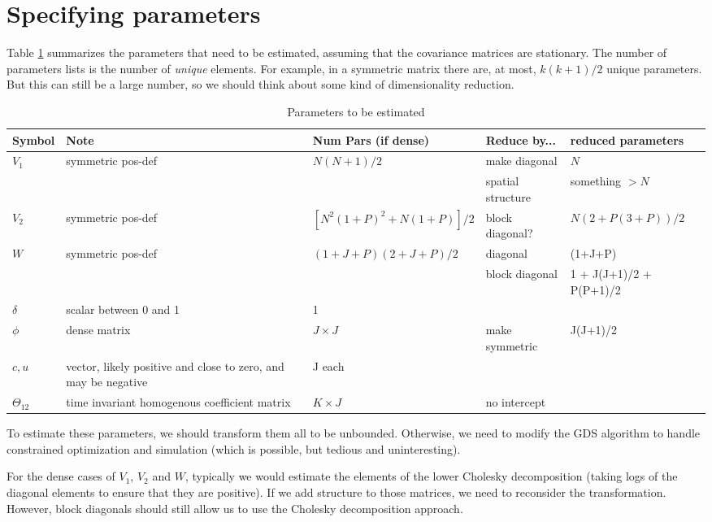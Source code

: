 \documentclass[letter,10pt]{article}
\begin{document}
\section*{Specifying parameters}

Table \ref{tab:parameters} summarizes the parameters that need to be
estimated, assuming that the covariance matrices are stationary.  The
number of parameters lists is the number of \emph{unique} elements.
For example, in a symmetric matrix there are, at most, $k(k+1)/2$
unique parameters.  But this can still be a large number, so we should
think about some kind of dimensionality reduction.
\begin{table}[h]\centering
  \begin{tabular}{lllll}
Symbol&Note&Num Pars (if dense)&Reduce by...&reduced parameters\\
\hline
$V_1$&symmetric pos-def&$N(N+1)/2$&make diagonal&$N$\\
&&&spatial structure&something $>N$\\
$V_2$&symmetric pos-def&\parbox{2.5cm}{$[N^2(1+P)^2+N(1+P)]/2$}&block diagonal?&$N(2+P(3+P))/2$\\
$W$&symmetric pos-def&$(1+J+P)(2+J+P)/2$&diagonal& (1+J+P)\\
&&&block diagonal& 1 + J(J+1)/2 + P(P+1)/2\\
$\delta$&scalar between 0 and 1&1&&\\
$\phi$ & dense matrix	&$J \times J$ &make symmetric & J(J+1)/2\\
$c,u$&\parbox{3cm}{vector, likely positive and close to zero, and may be negative}&J each&&\\
$\Theta_{12}$& \parbox{3cm}{time invariant homogenous coefficient matrix}&$K\times J$&no intercept&
  \end{tabular}
\caption{Parameters to be estimated}
\label{tab:parameters}
\end{table}

To estimate these parameters, we should transform them all to be
unbounded.  Otherwise, we need to modify the GDS algorithm to handle
constrained optimization and simulation (which is possible, but
tedious and uninteresting).

For the dense cases of $V_1$, $V_2$ and $W$, typically we would
estimate the elements of the lower Cholesky decomposition (taking logs
of the diagonal elements to ensure that they are positive).  If we add
structure to those matrices, we need to reconsider the
transformation.  However, block diagonals should still allow us to use
the Cholesky decomposition approach.  
\end{document}
